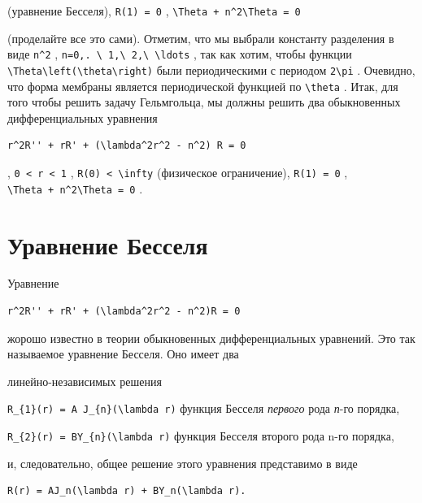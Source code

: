 \documentclass[
  ukrainian,
]{article}
\begin{document}
(уравнение Бесселя), \texttt{R(1)\ =\ 0} ,
\texttt{\textbackslash{}Theta\textquotesingle{}\textquotesingle{}\ +\ n\^{}2\textbackslash{}Theta\ =\ 0}

(проделайте все это сами). Отметим, что мы выбрали константу разделения
в виде \texttt{n\^{}2} ,
\texttt{n=0,.\ \textbackslash{}\ 1,\textbackslash{}\ 2,\textbackslash{}\ \textbackslash{}ldots}
, так как хотим, чтобы функции
\texttt{\textbackslash{}Theta\textbackslash{}left(\textbackslash{}theta\textbackslash{}right)}
были периодическими с периодом \texttt{2\textbackslash{}pi} . Очевидно,
что форма мембраны является периодической функцией по
\texttt{\textbackslash{}theta} . Итак, для того чтобы решить задачу
Гельмгольца, мы должны решить два обыкновенных дифференциальных
уравнения

\begin{verbatim}
r^2R'' + rR' + (\lambda^2r^2 - n^2) R = 0
\end{verbatim}

, \texttt{0\ \textless{}\ r\ \textless{}\ 1} ,
\texttt{R(0)\ \textless{}\ \textbackslash{}infty} (физическое
ограничение), \texttt{R(1)\ =\ 0} ,
\texttt{\textbackslash{}Theta\textquotesingle{}\textquotesingle{}\ +\ n\^{}2\textbackslash{}Theta\ =\ 0}
.

\section{Уравнение
Бесселя}\label{ux443ux440ux430ux432ux43dux435ux43dux438ux435-ux431ux435ux441ux441ux435ux43bux44f}

Уравнение

\begin{verbatim}
r^2R'' + rR' + (\lambda^2r^2 - n^2)R = 0
\end{verbatim}

жорошо известно в теории обыкновенных дифференциальных уравнений. Это
так называемое уравнение Бесселя. Оно имеет два

линейно-независимых решения

\texttt{R\_\{1\}(r)\ =\ A\ J\_\{n\}(\textbackslash{}lambda\ r)} функция
Бесселя \emph{первого} рода \emph{п}-го порядка,

\texttt{R\_\{2\}(r)\ =\ BY\_\{n\}(\textbackslash{}lambda\ r)} функция
Бесселя второго рода n-го порядка,

и, следовательно, общее решение этого уравнения представимо в виде

\begin{verbatim}
R(r) = AJ_n(\lambda r) + BY_n(\lambda r).
\end{verbatim}
\end{document}
